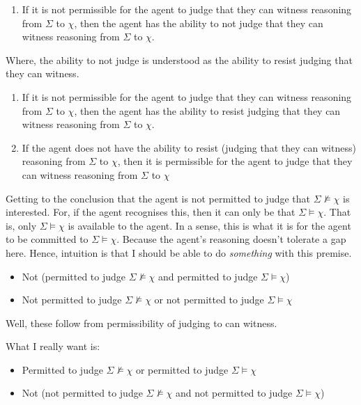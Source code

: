 \documentclass[10pt]{article}
\begin{document}
\begin{enumerate}
\item If it is not permissible for the agent to judge that they can witness reasoning from \(\Sigma\) to \(\chi\), then the agent has the ability to not judge that they can witness reasoning from \(\Sigma\) to \(\chi\).
\end{enumerate}

Where, the ability to not judge is understood as the ability to resist judging that they can witness.

\begin{enumerate}
\item If it is not permissible for the agent to judge that they can witness reasoning from \(\Sigma\) to \(\chi\), then the agent has the ability to resist judging that they can witness reasoning from \(\Sigma\) to \(\chi\).
\item If the agent does not have the ability to resist (judging that they can witness) reasoning from \(\Sigma\) to \(\chi\), then it is permissible for the agent to judge that they can witness reasoning from \(\Sigma\) to \(\chi\)
\end{enumerate}

Getting to the conclusion that the agent is not permitted to judge that \(\Sigma \nvDash \chi\) is interested.
For, if the agent recognises this, then it can only be that \(\Sigma \vDash \chi\).
That is, only \(\Sigma \vDash \chi\) is available to the agent.
In a sense, this is what it is for the agent to be committed to \(\Sigma \vDash \chi\).
Because the agent's reasoning doesn't tolerate a gap here.
Hence, intuition is that I should be able to do \emph{something} with this premise.

\begin{itemize}
\item Not (permitted to judge \(\Sigma \nvDash \chi\) and permitted to judge \(\Sigma \vDash \chi\))
\item Not permitted to judge \(\Sigma \nvDash \chi\) or not permitted to judge \(\Sigma \vDash \chi\)
\end{itemize}

Well, these follow from permissibility of judging to can witness.

What I really want is:

\begin{itemize}
\item Permitted to judge \(\Sigma \nvDash \chi\) or permitted to judge \(\Sigma \vDash \chi\)
\item Not (not permitted to judge \(\Sigma \nvDash \chi\) and not permitted to judge \(\Sigma \vDash \chi\))
\end{itemize}
\end{document}
